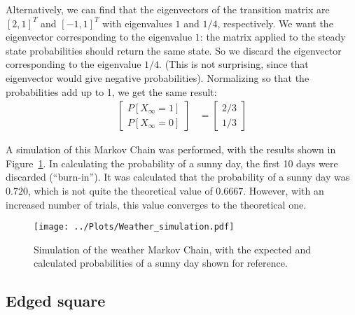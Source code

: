 \documentclass[twocolumn]{myarticle}
\newcommand{\mat}[1]{\begin{bmatrix}#1\end{bmatrix}}
\begin{document}
Alternatively, we can find that the eigenvectors of the transition matrix are $ [2,1]^T $ and $ [-1,1]^T $ with eigenvalues $ 1 $ and $ 1/4 $, respectively.
We want the eigenvector corresponding to the eigenvalue $ 1 $: the matrix applied to the steady state probabilities should return the same state.
So we discard the eigenvector corresponding to the eigenvalue $ 1/4 $.
(This is not surprising, since that eigenvector would give negative probabilities).
Normalizing so that the probabilities add up to 1, we get the same result:
\begin{align}
    \mat{P[X_\infty = 1] \\ P[X_\infty = 0]} &= \mat{2/3 \\ 1/3}
\end{align}

A simulation of this Markov Chain was performed, with the results shown in Figure~\ref{fig:weather_simulation}.
In calculating the probability of a sunny day, the first 10 days were discarded (``burn-in'').
It was calculated that the probability of a sunny day was $0.720$, which is not quite the theoretical value of $ 0.6667 $.
However, with an increased number of trials, this value converges to the theoretical one.

\begin{figure}[ht!]
    \begin{center}
    \texttt{[image: ../Plots/Weather\_simulation.pdf]}
    \caption{%
        Simulation of the weather Markov Chain, with the expected and calculated probabilities of a sunny day shown for reference.
    }
    \label{fig:weather_simulation}
    \end{center}
\end{figure}

\subsection{Edged square}
\label{subsec:edged_square}
\end{document}
